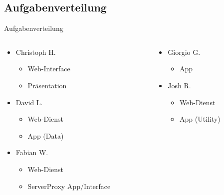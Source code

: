 \documentclass[19pt]{beamer}
\begin{document}
\subsection{Aufgabenverteilung}
\begin{frame}{Aufgabenverteilung}
  \begin{columns}[T]
    \begin{column}{.5\textwidth}
    		\begin{itemize}
    	\item Christoph H.
			\begin{itemize}
				\item Web-Interface
				\item Präsentation
			\end{itemize}
		\item David L.
			\begin{itemize}
				\item Web-Dienst
				\item App (Data)
			\end{itemize}
		\item Fabian W.
			\begin{itemize}
				\item Web-Dienst
				\item ServerProxy App/Interface
			\end{itemize}
    		\end{itemize}
    \end{column}
    \begin{column}{.5\textwidth}
    \begin{itemize}
		\item Giorgio G.
			\begin{itemize}
				\item App
			\end{itemize}
		\item Josh R.
			\begin{itemize}
				\item Web-Dienst
				\item App (Utility)
			\end{itemize}
	\end{itemize}
    \end{column}
  \end{columns}
\end{frame}
\end{document}
